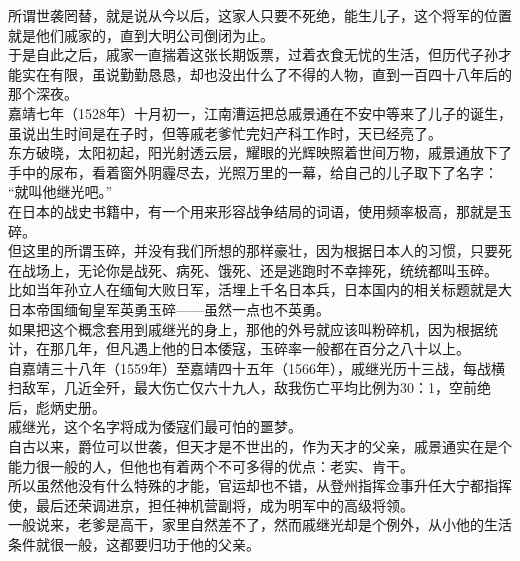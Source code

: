 \begin{multicols}{\theparacolNo}
所谓世袭罔替，就是说从今以后，这家人只要不死绝，能生儿子，这个将军的位置就是他们戚家的，直到大明公司倒闭为止。\\

于是自此之后，戚家一直揣着这张长期饭票，过着衣食无忧的生活，但历代子孙才能实在有限，虽说勤勤恳恳，却也没出什么了不得的人物，直到一百四十八年后的那个深夜。\\

嘉靖七年（1528年）十月初一，江南漕运把总戚景通在不安中等来了儿子的诞生，虽说出生时间是在子时，但等戚老爹忙完妇产科工作时，天已经亮了。\\

东方破晓，太阳初起，阳光射透云层，耀眼的光辉映照着世间万物，戚景通放下了手中的尿布，看着窗外阴霾尽去，光照万里的一幕，给自己的儿子取下了名字：\\

“就叫他继光吧。”\\

在日本的战史书籍中，有一个用来形容战争结局的词语，使用频率极高，那就是玉碎。\\

但这里的所谓玉碎，并没有我们所想的那样豪壮，因为根据日本人的习惯，只要死在战场上，无论你是战死、病死、饿死、还是逃跑时不幸摔死，统统都叫玉碎。\\

比如当年孙立人在缅甸大败日军，活埋上千名日本兵，日本国内的相关标题就是大日本帝国缅甸皇军英勇玉碎——虽然一点也不英勇。\\

如果把这个概念套用到戚继光的身上，那他的外号就应该叫粉碎机，因为根据统计，在那几年，但凡遇上他的日本倭寇，玉碎率一般都在百分之八十以上。\\

自嘉靖三十八年（1559年）至嘉靖四十五年（1566年），戚继光历十三战，每战横扫敌军，几近全歼，最大伤亡仅六十九人，敌我伤亡平均比例为30：1，空前绝后，彪炳史册。\\

戚继光，这个名字将成为倭寇们最可怕的噩梦。\\

自古以来，爵位可以世袭，但天才是不世出的，作为天才的父亲，戚景通实在是个能力很一般的人，但他也有着两个不可多得的优点：老实、肯干。\\

所以虽然他没有什么特殊的才能，官运却也不错，从登州指挥佥事升任大宁都指挥使，最后还荣调进京，担任神机营副将，成为明军中的高级将领。\\

一般说来，老爹是高干，家里自然差不了，然而戚继光却是个例外，从小他的生活条件就很一般，这都要归功于他的父亲。\\


\end{multicols}
